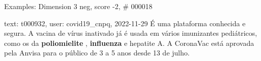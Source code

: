 \begin{frame}{Examples: Dimension 3 neg, score -2, \# 000018}
\footnotesize
\begin{alertblock}{text: t000932, user: covid19\_cnpq, 2022-11-29}
É uma plataforma conhecida e segura. A vacina de vírus inativado já é usada em 
vários imunizantes pediátricos, como os da \textbf{poliomielite} , 
\textbf{influenza} e hepatite A. A CoronaVac está aprovada pela Anvisa para o 
público de 3 a 5 anos desde 13 de julho. 
\end{alertblock}
\end{frame}
